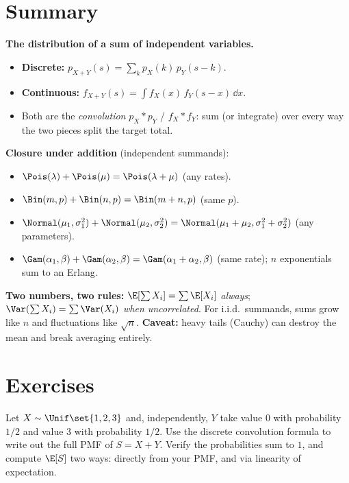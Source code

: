 \section{Summary}
\label{ch17:summary}

\begin{formalbox}
\textbf{The distribution of a sum of independent variables.}
\begin{itemize}
  \item \textbf{Discrete:} $p_{X+Y}(s)=\sum_k p_X(k)\,p_Y(s-k)$.
  \item \textbf{Continuous:} $f_{X+Y}(s)=\int f_X(x)\,f_Y(s-x)\,\dd x$.
  \item Both are the \emph{convolution} $p_X*p_Y$ / $f_X*f_Y$: sum (or
        integrate) over every way the two pieces split the target total.
\end{itemize}
\textbf{Closure under addition} (independent summands):
\begin{itemize}
  \item $\Pois(\lambda)+\Pois(\mu)=\Pois(\lambda+\mu)$ (any rates).
  \item $\Bin(m,p)+\Bin(n,p)=\Bin(m+n,p)$ (same $p$).
  \item $\Normal(\mu_1,\sigma_1^2)+\Normal(\mu_2,\sigma_2^2)
        =\Normal(\mu_1+\mu_2,\sigma_1^2+\sigma_2^2)$ (any parameters).
  \item $\Gam(\alpha_1,\beta)+\Gam(\alpha_2,\beta)=\Gam(\alpha_1+\alpha_2,\beta)$
        (same rate); $n$ exponentials sum to an Erlang.
\end{itemize}
\textbf{Two numbers, two rules:} $\E[\sum X_i]=\sum\E[X_i]$ \emph{always};
$\Var(\sum X_i)=\sum\Var(X_i)$ \emph{when uncorrelated}. For i.i.d.\
summands, sums grow like $n$ and fluctuations like $\sqrt n$.
\textbf{Caveat:} heavy tails (Cauchy) can destroy the mean and break
averaging entirely.
\end{formalbox}

\section{Exercises}
\label{ch17:exercises}

\begin{exercise}
\label{ch17:ex-byhand}
Let $X\sim\Unif\set{1,2,3}$ and, independently, $Y$ take value $0$ with
probability $1/2$ and value $3$ with probability $1/2$. Use the discrete
convolution formula to write out the full PMF of $S=X+Y$. Verify the
probabilities sum to $1$, and compute $\E[S]$ two ways: directly from your
PMF, and via linearity of expectation.
\end{exercise}


